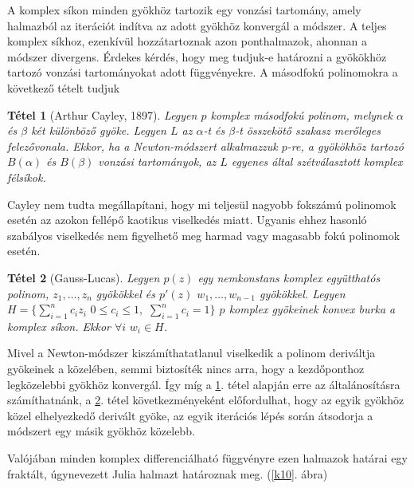 \documentclass[a4paper,12pt]{report}
\newtheorem{Tet}{Tétel}[section]
\begin{document}
			
			A komplex síkon minden gyökhöz tartozik egy vonzási tartomány, amely halmazból az iterációt indítva az adott gyökhöz konvergál a módszer. A teljes komplex síkhoz, ezenkívül hozzátartoznak azon ponthalmazok, ahonnan a módszer divergens. Érdekes kérdés, hogy meg tudjuk-e határozni a gyökökhöz tartozó vonzási tartományokat adott függvényekre. A másodfokú polinomokra a következő tételt tudjuk
			\begin{Tet}[Arthur Cayley, 1897] \label{Cayley}
				Legyen $p$ komplex másodfokú polinom, melynek $\alpha$ és $\beta$ két különböző gyöke. Legyen $L$ az $\alpha$-t és $\beta$-t összekötő szakasz merőleges felezővonala. Ekkor, ha a Newton-módszert alkalmazzuk $p$-re, a gyökökhöz tartozó $B(\alpha)$ és $B(\beta)$ vonzási tartományok, az $L$ egyenes által szétválasztott komplex félsíkok.
			\end{Tet}
			Cayley nem tudta megállapítani, hogy mi teljesül nagyobb fokszámú polinomok esetén az azokon fellépő kaotikus viselkedés miatt. Ugyanis ehhez hasonló szabályos viselkedés nem figyelhető meg harmad vagy magasabb fokú polinomok esetén.
            
     
			\begin{Tet}[Gauss-Lucas]\label{GL}
				Legyen $p(z)$ egy nemkonstans komplex együtthatós polinom, $z_1,\ldots,z_n$ gyökökkel és $p'(z)$ $w_1,\ldots,w_{n-1}$ gyökökkel. Legyen $H=\{\sum_{i=1}^n c_iz_i\,\,0\leq c_i\leq 1,\,\,\sum_{i=1}^n c_i=1\}$ $p$ komplex gyökeinek konvex burka a komplex síkon. Ekkor $\forall i\,\,w_i\in H$.
			\end{Tet}
Mivel a Newton-módszer kiszámíthatatlanul viselkedik a polinom deriváltja gyökeinek a közelében, semmi biztosíték nincs arra, hogy a kezdőponthoz legközelebbi gyökhöz konvergál. Így míg a \ref{Cayley}. tétel alapján erre az általánosításra számíthatnánk, a \ref{GL}. tétel következményeként előfordulhat, hogy az egyik gyökhöz közel elhelyezkedő derivált gyöke, az egyik iterációs lépés során átsodorja a módszert egy másik gyökhöz közelebb. 


			Valójában minden komplex differenciálható függvényre ezen halmazok határai egy fraktált, úgynevezett Julia halmazt határoznak meg. (\ref{k10}. ábra)
\end{document}
